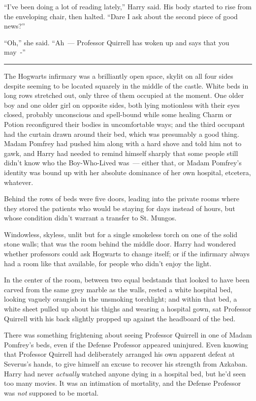 ``I've been doing a lot of reading lately,'' Harry said. His body started to rise from the enveloping chair, then halted. ``Dare I ask about the second piece of good news?''

``Oh,'' she said. ``Ah~--- Professor Quirrell has woken up and says that you may~-''

\begin{center}\rule{3in}{0.4pt}\end{center}

The Hogwarts infirmary was a brilliantly open space, skylit on all four sides despite seeming to be located squarely in the middle of the castle. White beds in long rows stretched out, only three of them occupied at the moment. One older boy and one older girl on opposite sides, both lying motionless with their eyes closed, probably unconscious and spell-bound while some healing Charm or Potion reconfigured their bodies in uncomfortable ways; and the third occupant had the curtain drawn around their bed, which was presumably a good thing. Madam Pomfrey had pushed him along with a hard shove and told him not to gawk, and Harry had needed to remind himself sharply that some people still didn't know who the Boy-Who-Lived was~--- either that, or Madam Pomfrey's identity was bound up with her absolute dominance of her own hospital, etcetera, whatever.

Behind the rows of beds were five doors, leading into the private rooms where they stored the patients who would be staying for days instead of hours, but whose condition didn't warrant a transfer to St. Mungos.

Windowless, skyless, unlit but for a single smokeless torch on one of the solid stone walls; that was the room behind the middle door. Harry had wondered whether professors could ask Hogwarts to change itself; or if the infirmary always had a room like that available, for people who didn't enjoy the light.

In the center of the room, between two equal bedstands that looked to have been carved from the same grey marble as the walls, rested a white hospital bed, looking vaguely orangish in the unsmoking torchlight; and within that bed, a white sheet pulled up about his thighs and wearing a hospital gown, sat Professor Quirrell with his back slightly propped up against the headboard of the bed.

There was something frightening about seeing Professor Quirrell in one of Madam Pomfrey's beds, even if the Defense Professor appeared uninjured. Even knowing that Professor Quirrell had deliberately arranged his own apparent defeat at Severus's hands, to give himself an excuse to recover his strength from Azkaban. Harry had never \emph{actually} watched anyone dying in a hospital bed, but he'd seen too many movies. It was an intimation of mortality, and the Defense Professor was \emph{not} supposed to be mortal.

